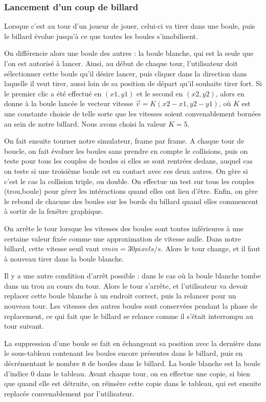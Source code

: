 \documentclass[a4paper,11pt]{article}
\begin{document}
\subsubsection{Lancement d'un coup de billard}
Lorsque c'est au tour d'un joueur de jouer, celui-ci va tirer dans une boule, puis le billard évolue jusqu'à
ce que toutes les boules s'imobilisent. 

On différencie alors une boule des autres : la boule blanche, qui est la seule que l'on est autorisé à lancer.
Ainsi, au début de chaque tour, l'utilisateur doit sélectionner cette boule qu'il désire lancer, puis cliquer
dans la direction dans laquelle il veut tirer, aussi loin de sa position de départ qu'il souhaite tirer fort.
Si le premier clic a été effectué en $(x1,y1)$ et le second en $(x2,y2)$, alors en donne à la boule lancée le
vecteur vitesse $\vec{v} = K(x2-x1,y2-y1)$, où $K$ est une constante choisie de telle sorte que les vitesses
soient convenablement bornées au sein de notre billard. Nous avons choisi la valeur $K=5$.

On fait ensuite tourner notre simulateur, frame par frame. A chaque tour de boucle, on fait évoluer les boules
sans prendre en compte le collisions, puis on teste pour tous les couples de boules si elles se sont rentrées
dedans, auquel cas on teste si une troisième boule est en contact avec ces deux autres. On gère si c'est le cas
la collision triple, ou double. On effectue un test sur tous les couples (trou,boule) pour gérer les intéractions
quand elles ont lieu d'être. Enfin, on gère le rebond de chacune des boules sur les bords du billard quand elles
commencent à sortir de la fenêtre graphique.

On arrête le tour lorsque les vitesses des boules sont toutes
inférieures à une certaine valeur fixée comme une approximation de vitesse nulle. Dans notre billard, cette
vitesse seuil vaut $vmin = 30 pixels/s$. Alors le tour change, et il faut à nouveau tirer dans la boule blanche.

Il y a une autre condition d'arrêt possible : dans le cas où la boule blanche tombe dans un trou au cours du
tour. Alors le tour s'arrête, et l'utilisateur va devoir replacer cette boule blanche à un endroit correct,
puis la relancer pour un nouveau tour. Les vitesses des autres boules sont conservées pendant la phase de 
replacement, ce qui fait que le billard se relance comme il s'était interrompu au tour suivant.

La suppression d'une boule se fait en échangeant sa position avec la dernière dans le sous-tableau contenant
les boules encore présentes dans le billard, puis en décrémentant le nombre \texttt{n} de boules dans le billard.
La boule blanche est la boule d'indice $0$ dans le tableau. Avant chaque tour, on en effectue une copie, si bien
que quand elle est détruite, on réinsère cette copie dans le tableau, qui est ensuite replacée convenablement
par l'utilisateur.
\end{document}
